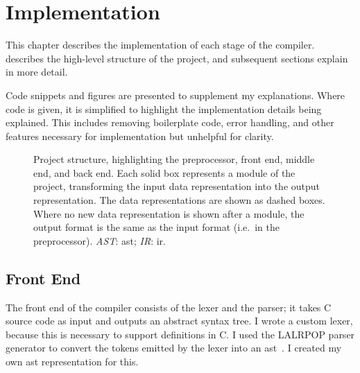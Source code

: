 \documentclass[00-main.tex]{subfiles}
\begin{document}
\chapter{Implementation}

This chapter describes the implementation of each stage of the compiler.
 describes the high-level structure of the project, and subsequent sections explain in more detail.

Code snippets and figures are presented to supplement my explanations.
Where code is given, it is simplified to highlight the implementation details being explained.
This includes removing boilerplate code, error handling, and other features necessary for implementation but unhelpful for clarity.

\begin{figure}[!t]
  \centering
  \caption{Project structure, highlighting the preprocessor, front end, middle end, and back end. Each solid box represents a module of the project, transforming the input data representation into the output representation. The data representations are shown as dashed boxes. Where no new data representation is shown after a module, the output format is the same as the input format (i.e.~in the preprocessor). \emph{AST}: \acrlong{ast}; \emph{IR}: \acrlong{ir}.}%
  \label{fig:project flowchart}
\end{figure}



\section{Front End}\label{sec:impl:front end}


The front end of the compiler consists of the lexer and the parser; it takes C source code as input and outputs an abstract syntax tree.
I wrote a custom lexer, because this is necessary to support  definitions in C\@.
I used the LALRPOP parser generator to convert the tokens emitted by the lexer into an \gls{ast}~.
I created my own \gls{ast} representation for this.
\end{document}
